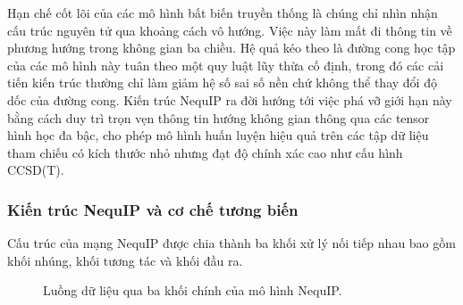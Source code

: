 Hạn chế cốt lõi của các mô hình bất biến truyền thống là chúng chỉ nhìn nhận cấu trúc nguyên tử qua khoảng cách vô hướng. Việc này làm mất đi thông tin về phương hướng trong không gian ba chiều. Hệ quả kéo theo là đường cong học tập của các mô hình này tuân theo một quy luật lũy thừa cố định, trong đó các cải tiến kiến trúc thường chỉ làm giảm hệ số sai số nền chứ không thể thay đổi độ dốc của đường cong. Kiến trúc NequIP ra đời hướng tới việc phá vỡ giới hạn này bằng cách duy trì trọn vẹn thông tin hướng không gian thông qua các tensor hình học đa bậc, cho phép mô hình huấn luyện hiệu quả trên các tập dữ liệu tham chiếu có kích thước nhỏ nhưng đạt độ chính xác cao như cấu hình CCSD(T).

\subsubsection{Kiến trúc NequIP và cơ chế tương biến}

Cấu trúc của mạng NequIP được chia thành ba khối xử lý nối tiếp nhau bao gồm khối nhúng, khối tương tác và khối đầu ra.

\begin{figure}[H]
\centering
{}
\caption{Luồng dữ liệu qua ba khối chính của mô hình NequIP.}
\label{fig:nequip-pipeline}
\end{figure}

